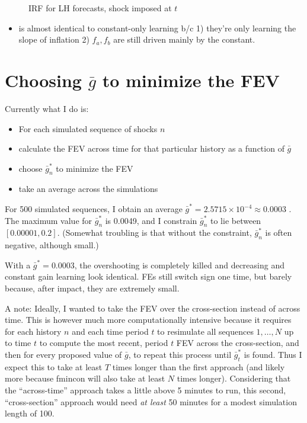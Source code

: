 \documentclass[11pt]{article}
\def \myFigPath {../figures/}
\renewcommand{\[}{\begin{equation}}
\renewcommand{\]}{\end{equation}}
\def\myAdjustableFigScale{0.18}
\begin{document}
\begin{figure}[h!]
\caption{IRF for LH forecasts, shock imposed at $t$}
\end{figure}

\begin{itemize}
\item is almost identical to constant-only learning b/c 1) they're only learning the slope of inflation 2) $f_a, f_b$ are still driven mainly by the constant.
\end{itemize}

\newpage
\section{Choosing $\bar{g}$ to minimize the FEV}
Currently what I do is:
\begin{itemize}
\item For each simulated sequence of shocks $n$
\item calculate the FEV across time for that particular history as a function of $\bar{g}$
\item choose $\bar{g}^*_n$ to minimize the FEV
\item take an average across the simulations
\end{itemize}
For 500 simulated sequences, I obtain an average $\bar{g}^* = 2.5715 \times 10^{-4} \approx 0.0003$ . The maximum value for $\bar{g}^*_n$ is 0.0049, and I constrain $\bar{g}^*_n$ to lie between $[ 0.00001, 0.2]$. (Somewhat troubling is that without the constraint, $\bar{g}^*_n$ is often negative, although small.)

With a $\bar{g}^* = 0.0003$, the overshooting is completely killed and decreasing and constant gain learning look identical. FEs still switch sign one time, but barely because, after impact, they are extremely small. 

A note: Ideally, I wanted to take the FEV over the cross-section instead of across time. This is however much more computationally intensive because it requires for each history $n$ and each time period $t$ to resimulate all sequences $1,\dots, N$ up to time $t$ to compute the most recent, period $t$ FEV across the cross-section, and then for every proposed value of $\bar{g}$, to repeat this process until $\bar{g}^*_t$ is found. Thus I expect this to take at least $T$ times longer than the first approach (and likely more because fmincon will also take at least $N$ times longer). Considering that the ``across-time'' approach takes a little above 5 minutes to run, this second, ``cross-section'' approach would need \emph{at least} 50 minutes for a modest simulation length of 100. 
\end{document}
